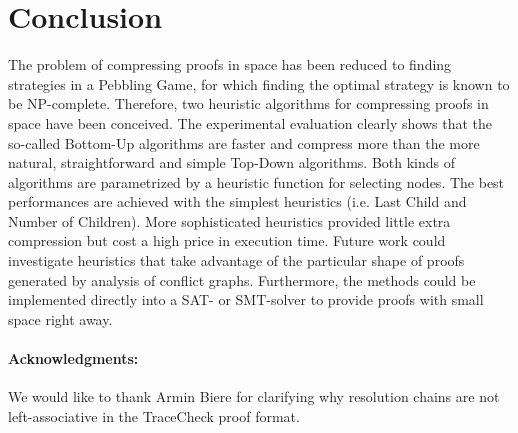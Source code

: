 \section{Conclusion}
\label{sec:conclusion}

The problem of compressing proofs in space has been reduced to finding strategies in a Pebbling Game, for which finding the optimal strategy is known to be NP-complete.
Therefore, two heuristic algorithms for compressing proofs in space have been conceived. The experimental evaluation clearly shows that the so-called Bottom-Up algorithms are faster and compress more than the more natural, straightforward and simple Top-Down algorithms. Both kinds of algorithms are parametrized by a heuristic function for selecting nodes. The best performances are achieved with the simplest heuristics (i.e. Last Child and Number of Children). More sophisticated heuristics provided little extra compression but cost a high price in execution time. Future work could investigate heuristics that take advantage of the particular shape of proofs generated by analysis of conflict graphs.
Furthermore, the methods could be implemented directly into a SAT- or SMT-solver to provide proofs with small space right away.

\vspace{-5pt}
\paragraph{Acknowledgments:} We would like to thank Armin Biere for clarifying why resolution chains are not left-associative in the TraceCheck proof format.

\vspace{-5pt}

